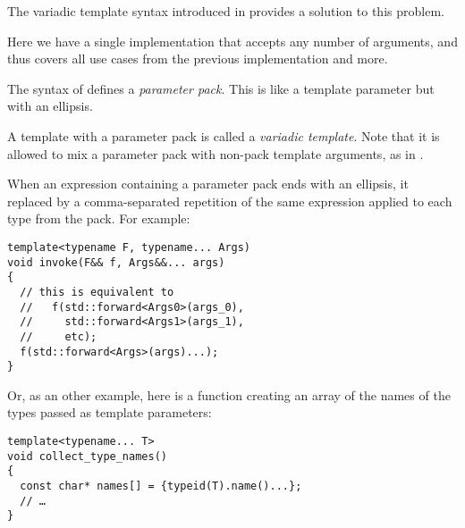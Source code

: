 \bigskip

The variadic template syntax introduced in  provides a solution
to this problem.


Here we have a single implementation that accepts any number of
arguments, and thus covers all use cases from the previous
implementation and more.

\bigskip

The syntax of  defines a \emph{parameter
  pack}. This is like a template parameter but with an ellipsis.

A template with a parameter pack is called a \emph{variadic
  template}. Note that it is allowed to mix a parameter pack with
non-pack template arguments, as in .

When an expression containing a parameter pack ends with an ellipsis,
it replaced by a comma-separated repetition of the same expression
applied to each type from the pack. For example:

\begin{lstlisting}
template<typename F, typename... Args)
void invoke(F&& f, Args&&... args)
{
  // this is equivalent to
  //   f(std::forward<Args0>(args_0),
  //     std::forward<Args1>(args_1),
  //     etc);
  f(std::forward<Args>(args)...);
}
\end{lstlisting}

Or, as an other example, here is a function creating an array of the
names of the types passed as template parameters:

\begin{lstlisting}
template<typename... T>
void collect_type_names()
{
  const char* names[] = {typeid(T).name()...};
  // …
}
\end{lstlisting}
